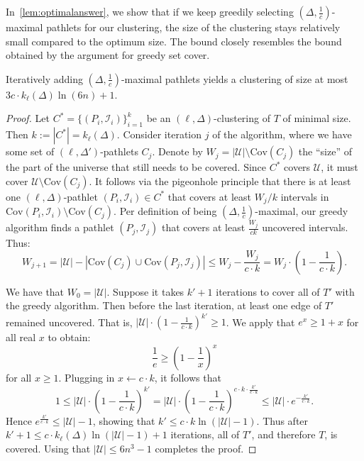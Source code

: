\documentclass[a4paper,UKenglish,cleveref,thm-restate,notab]{lipics-v2021}
\newcommand{\I}{\mathcal{I}}
\newcommand{\U}{\mathcal{U}}
\newcommand{\Cov}{\ensuremath{\mathrm{Cov}}}
\begin{document}
    \noindent
    In~\cref{lem:optimalanswer}, we show that if we keep greedily selecting $(\Delta, \frac{1}{c})$-maximal pathlets for our clustering, the size of the clustering stays relatively small compared to the optimum size.
    The bound closely resembles the bound obtained by the argument for greedy set cover.

    \begin{lemma}
    \label{lem:optimalanswer}
        Iteratively adding $(\Delta, \frac{1}{c})$-maximal pathlets yields a clustering of size at most $3c \cdot k_\ell(\Delta) \ln (6n) + 1$.
    \end{lemma}
    \begin{proof}
        Let $C^* = \{ (P_i, \I_i) \}_{i=1}^k$ be an $(\ell, \Delta)$-clustering of $T$ of minimal size. 
        Then $k := |C^*| = k_{\ell}(\Delta)$. 
        Consider iteration $j$ of the algorithm, where we have some set of $(\ell, \Delta')$-pathlets $C_j$.
        Denote by $W_j = |\U| \setminus \Cov(C_j)$ the ``size'' of the part of the universe that still needs to be covered.
        Since $C^*$ covers $\U$, it must cover $\U \setminus \Cov(C_j)$. 
        It follows via the pigeonhole principle that there is at least one $(\ell,\Delta)$-pathlet $(P_i, \I_i) \in C^*$ that covers at least $W_j / k$ intervals in $\Cov(P_i, \I_i) \setminus \Cov(C_j)$.
        Per definition of being $(\Delta, \frac{1}{c})$-maximal, our greedy algorithm finds a pathlet $(P_j, \I_j)$ that covers at least $\frac{W_j}{ck}$ uncovered intervals.
        Thus:
        \[
            W_{j+1} = |\U| - | \Cov(C_j) \cup \Cov(P_j, \I_j) |
            \leq W_j - \frac{W_j}{c \cdot k} = W_j \cdot ( 1 - \frac{1}{c \cdot k} ).
        \]
        
        We have that $W_0 = |\U|$.
        Suppose it takes $k'+1$ iterations to cover all of $T'$ with the greedy algorithm.
        Then before the last iteration, at least one edge of $T'$ remained uncovered.
        That is, $|\U| \cdot \left( 1-\frac{1}{c \cdot k} \right)^{k'} \geq 1$.
        We apply that $e^x \geq 1+x$ for all real $x$ to obtain: 
        \[
            \frac{1}{e} \geq \left( 1-\frac{1}{x} \right)^x
        \]
        for all $x \geq 1$.
        Plugging in $x \gets c \cdot k$, it follows that
        \[
            1 \leq |\U| \cdot \left( 1 - \frac{1}{c \cdot k} \right)^{k'}
            = |\U| \cdot \left( 1 - \frac{1}{c \cdot k} \right)^{c \cdot k \cdot \frac{k'}{c \cdot k}}
            \leq |\U| \cdot e^{-\frac{k'}{c \cdot k}}.
        \]
        Hence $e^{\frac{k'}{c \cdot k}} \leq |\U|-1$, showing that $k' \leq c \cdot k \ln (|\U|-1)$.
        Thus after $k'+1 \leq c \cdot k_\ell(\Delta) \ln (|\U|-1) + 1$ iterations, all of $T'$, and therefore $T$, is covered.
        Using that $|\U| \leq 6n^3-1$ completes the proof.
    \end{proof}
\end{document}
